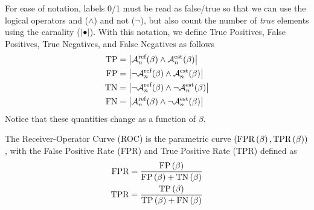For ease of notation, labels 0/1 must be read as false/true so that we can use the logical operators and ($\wedge$) and not ($\neg$), but also count the number of \textit{true} elements using the carnality ($\left| {\bullet} \right|$).
%
With this notation, we define True Positives, False Positives, True Negatives, and False Negatives as follows
\begin{align}
\text{TP}
&=
\left| { 
\mathcal{A}_n^{\text{ref}}(\beta) \wedge 
\mathcal{A}_n^{\text{est}}(\beta) } \right|
\\
\text{FP}
&=
\left| { 
\neg \mathcal{A}_n^{\text{ref}}(\beta) \wedge 
\mathcal{A}_n^{\text{est}}(\beta) } \right|
\\
\text{TN}
&=
\left| { 
\neg \mathcal{A}_n^{\text{ref}}(\beta) \wedge 
\neg \mathcal{A}_n^{\text{est}}(\beta) } \right|
\\
\text{FN}
&=
\left| { 
\mathcal{A}_n^{\text{ref}}(\beta) \wedge 
\neg \mathcal{A}_n^{\text{est}}(\beta) } \right|
\end{align}
Notice that these quantities change as a function of $\beta$.

The Receiver-Operator Curve (ROC) is the parametric curve 
$\left( \text{FPR}\left( \beta \right), \text{TPR}\left( \beta \right) \right)$, with the False Positive Rate (FPR) and True Positive Rate (TPR) defined as
\begin{align}
\text{FPR}
&=
\frac{ \text{FP}\left( \beta \right) }{\text{FP}\left( \beta \right) + \text{TN}\left( \beta \right)}
\\
\text{TPR}
&=
\frac{ \text{TP}\left( \beta \right) }{\text{TP}\left( \beta \right) + \text{FN}\left( \beta \right)}
\end{align}

